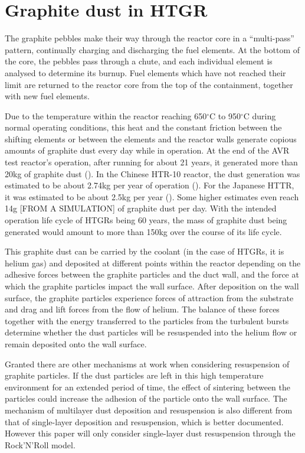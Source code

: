 \documentclass{article}
\begin{document}
\section{Graphite dust in HTGR}

The graphite pebbles make their way through the reactor core in a “multi-pass” pattern, continually charging and discharging the fuel elements. At the bottom of the core, the pebbles pass through a chute, and each individual element is analysed to determine its burnup. Fuel elements which have not reached their limit are returned to the reactor core from the top of the containment, together with new fuel elements. 

Due to the temperature within the reactor reaching 650$^{\circ}$C to 950$^{\circ}$C during normal operating conditions, this heat and the constant friction between the shifting elements or between the elements and the reactor walls generate copious amounts of graphite dust every day while in operation. At the end of the AVR test reactor's operation, after running for about 21 years, it generated more than 20kg of graphite dust (\cite{kiss11}). In the Chinese HTR-10 reactor, the dust generation was estimated to be about 2.74kg per year of operation (\cite{LUO201735}). For the Japanese HTTR, it was estimated to be about 2.5kg per year (\cite{Sriyono18}). Some higher estimates even reach 14g [FROM A SIMULATION] of graphite dust per day. With the intended operation life cycle of HTGRs being 60 years, the mass of graphite dust being generated would amount to more than 150kg over the course of its life cycle. 

This graphite dust can be carried by the coolant (in the case of HTGRs, it is helium gas) and deposited at different points within the reactor depending on the adhesive forces between the graphite particles and the duct wall, and the force at which the graphite particles impact the wall surface. After deposition on the wall surface, the graphite particles experience forces of attraction from the substrate and drag and lift forces from the flow of helium. The balance of these forces together with the energy transferred to the particles from the turbulent bursts determine whether the dust particles will be resuspended into the helium flow or remain deposited onto the wall surface. 

Granted there are other mechanisms at work when considering resuspension of graphite particles. If the dust particles are left in this high temperature environment for an extended period of time, the effect of sintering between the particles could increase the adhesion of the particle onto the wall surface. The mechanism of multilayer dust deposition and resuspension is also different from that of single-layer deposition and resuspension, which is better documented. However this paper will only consider single-layer dust resuspension through the Rock'N'Roll model. 
\end{document}
